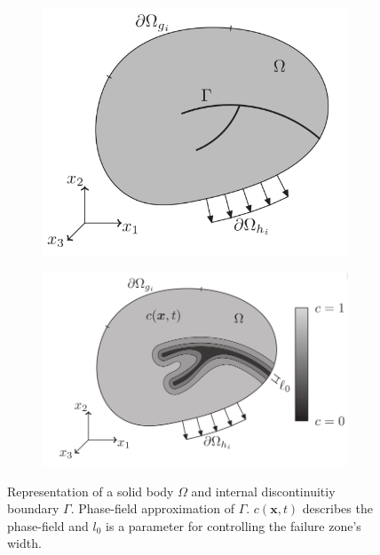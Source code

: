\begin{figure}[ht!]
    \centering
    \begin{subfigure}[t]{0.4\textwidth}
        \centering
        \includegraphics[scale=0.3]{data/Body_1}
        \caption{}\label{fig:body_1}
    \end{subfigure}
    \begin{subfigure}[t]{0.5\textwidth}
        \centering
        \includegraphics[scale=0.3]{data/Body_2}
        \caption{}\label{fig:body_2}
    \end{subfigure}
    \caption{ Representation of a solid body $\Omega$ and internal discontinuitiy boundary $\Gamma$.  Phase-field approximation of $\Gamma$. $c\left(\mathbf{x},t\right)$ describes the phase-field and $l_{0}$ is a parameter for controlling the failure zone's width. \cite{01_PF_dyn_brittle}} \label{fig:bodies}
\end{figure}


